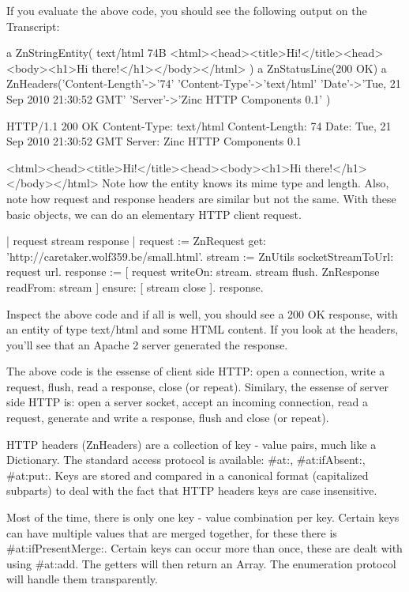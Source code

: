 \documentclass[a4paper,10pt,twoside]{book}
\begin{document}
If you evaluate the above code, you should see the following output on the Transcript:

a ZnStringEntity( text/html 74B <html><head><title>Hi!</title><head><body><h1>Hi there!</h1></body></html> )
a ZnStatusLine(200 OK)
a ZnHeaders('Content-Length'->'74' 'Content-Type'->'text/html' 'Date'->'Tue, 21 Sep 2010 21:30:52 GMT' 
'Server'->'Zinc HTTP Components 0.1' )

HTTP/1.1 200 OK
Content-Type: text/html
Content-Length: 74
Date: Tue, 21 Sep 2010 21:30:52 GMT
Server: Zinc HTTP Components 0.1

<html><head><title>Hi!</title><head><body><h1>Hi there!</h1></body></html>
Note how the entity knows its mime type and length. Also, note how request and response headers are similar but not the same. With these basic objects, we can do an elementary HTTP client request.

\begin{code}{}
| request stream response |
request := ZnRequest get: 'http://caretaker.wolf359.be/small.html'.
stream := ZnUtils socketStreamToUrl: request url.
response := [ 
  request writeOn: stream. 
  stream flush. 
  ZnResponse readFrom: stream ] ensure: [ stream close ].
response.
\end{code}

Inspect the above code and if all is well, you should see a 200 OK response, with an entity of type text/html and some HTML content. If you look at the headers, you'll see that an Apache 2 server generated the response.

The above code is the essense of client side HTTP: open a connection, write a request, flush, read a response, close (or repeat). Similary, the essense of server side HTTP is: open a server socket, accept an incoming connection, read a request, generate and write a response, flush and close (or repeat).

HTTP headers (ZnHeaders) are a collection of key - value pairs, much like a Dictionary. The standard access protocol is available: #at:, #at:ifAbsent:, #at:put:. Keys are stored and compared in a canonical format (capitalized subparts) to deal with the fact that HTTP headers keys are case insensitive.

Most of the time, there is only one key - value combination per key. Certain keys can have multiple values that are merged together, for these there is #at:ifPresentMerge:. Certain keys can occur more than once, these are dealt with using #at:add. The getters will then return an Array. The enumeration protocol will handle them transparently.
\end{document}
